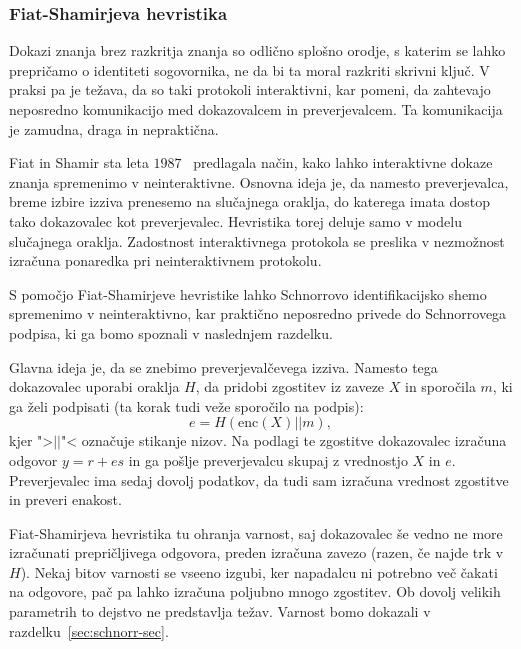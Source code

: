 \subsubsection{Fiat-Shamirjeva hevristika}
\label{sec:fiat-shamir}
Dokazi znanja brez razkritja znanja so odlično splošno orodje, s katerim se lahko prepričamo
o identiteti sogovornika, ne da bi ta moral razkriti skrivni ključ. V praksi pa je težava, da so
taki protokoli interaktivni, kar pomeni, da zahtevajo neposredno komunikacijo med dokazovalcem in
preverjevalcem. Ta komunikacija je zamudna, draga in nepraktična.

Fiat in Shamir sta leta $1987$~\cite{fiat1987heuristic} predlagala način, kako lahko interaktivne
dokaze znanja spremenimo v neinteraktivne. Osnovna ideja je, da namesto preverjevalca, breme izbire
izziva prenesemo na slučajnega oraklja, do katerega imata dostop tako dokazovalec kot preverjevalec.
Hevristika torej deluje samo v modelu slučajnega oraklja. Zadostnost interaktivnega protokola se
preslika v nezmožnost izračuna ponaredka pri neinteraktivnem protokolu.

\begin{primer}
\label{primer:fiat-shamir}
    S pomočjo Fiat-Shamirjeve hevristike lahko Schnorrovo identifikacijsko shemo spremenimo v
    neinteraktivno, kar praktično neposredno privede do Schnorrovega podpisa, ki ga bomo spoznali
    v naslednjem razdelku.

    Glavna ideja je, da se znebimo preverjevalčevega izziva. Namesto tega dokazovalec uporabi
    oraklja $H$, da pridobi zgostitev iz zaveze $X$ in sporočila $m$, ki ga želi podpisati (ta
    korak tudi veže sporočilo na podpis):
    $$
    e = H(\text{enc}(X) || m),
    $$
    kjer ">$||$"< označuje stikanje nizov. Na podlagi te zgostitve dokazovalec izračuna odgovor
    $y = r + es$ in ga pošlje preverjevalcu skupaj z vrednostjo $X$ in $e$. Preverjevalec ima sedaj
    dovolj podatkov, da tudi sam izračuna vrednost zgostitve in preveri enakost.

    Fiat-Shamirjeva hevristika tu ohranja varnost, saj dokazovalec še vedno ne more izračunati
    prepričljivega odgovora, preden izračuna zavezo (razen, če najde trk v $H$). Nekaj bitov
    varnosti se vseeno izgubi, ker napadalcu ni potrebno več čakati na odgovore, pač pa lahko izračuna
    poljubno mnogo zgostitev. Ob dovolj velikih parametrih to dejstvo ne predstavlja težav. Varnost bomo
    dokazali v razdelku~\ref{sec:schnorr-sec}.
\end{primer}
